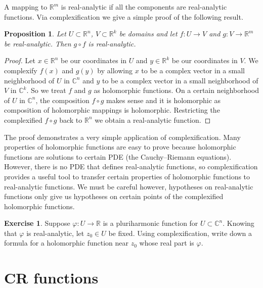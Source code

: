 \documentclass[12pt,openany]{book}
\newcommand{\C}{{\mathbb{C}}}
\newcommand{\R}{{\mathbb{R}}}
\theoremstyle{plain}
\newtheorem{prop}[thm]{Proposition}
\theoremstyle{remark}
\theoremstyle{definition}
\newenvironment{exbox}{%
    \def\FrameCommand{\vrule width 1pt \relax\hspace {10pt}}%
    \MakeFramed {\advance \hsize -\width \FrameRestore }%
}{%
    \endMakeFramed
}
\theoremstyle{exercise}
\newtheorem{exercise}{Exercise}[section]
\theoremstyle{example}
\begin{document}
A mapping to $\R^m$ is real-analytic if all the components are real-analytic
functions.  Via complexification we give a simple proof of the following
result.

\begin{prop}
Let $U \subset \R^n$, $V \subset \R^k$ be domains and let
$f \colon U \to V$ and $g \colon V \to \R^m$ be real-analytic.
Then $g \circ f$ is real-analytic.
\end{prop}

\begin{proof}
Let $x \in \R^n$ be our coordinates in $U$ and $y \in \R^k$ be
our coordinates in $V$.  We complexify $f(x)$ and $g(y)$ by
allowing $x$ to be a complex vector in a small neighborhood of $U$ in
$\C^n$
and  $y$ to be a complex vector in a small neighborhood of $V$ in $\C^k$.
So we treat $f$ and $g$ as holomorphic functions.  On a certain
neighborhood of $U$ in $\C^n$, the composition $f \circ g$ makes sense
and it is holomorphic as composition of holomorphic mappings is holomorphic.
Restricting the complexified $f \circ g$ back to $\R^n$ we obtain a
real-analytic function.
\end{proof}

The proof demonstrates a very simple application of complexification.  Many
properties of holomorphic functions are easy to prove because
holomorphic functions are solutions to certain PDE (the Cauchy--Riemann
equations).  However, there is no PDE
that defines real-analytic functions, so complexification provides a useful
tool to transfer certain properties of holomorphic functions to
real-analytic functions.  We must be careful however, hypotheses on
real-analytic functions only give us hypotheses on certain points of the
complexified holomorphic functions.

\begin{exbox}
\begin{exercise}
Suppose $\varphi \colon U \to \R$ is a pluriharmonic function for $U \subset
\C^n$.  Knowing that $\varphi$ is real-analytic, let $z_0 \in U$ be fixed.
Using complexification, write down a formula for a holomorphic function near
$z_0$ whose real part is $\varphi$.
\end{exercise}
\end{exbox}


\section{CR functions}
\end{document}
